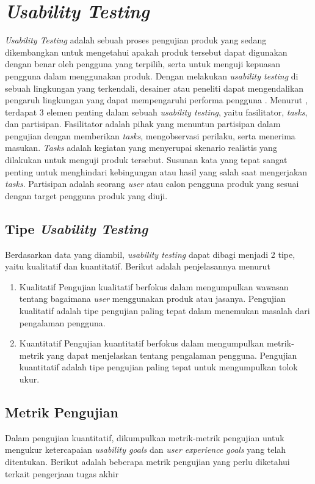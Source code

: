 \section{\textit{Usability Testing}}
\textit{Usability Testing} adalah sebuah proses pengujian produk yang sedang dikembangkan untuk mengetahui apakah produk tersebut dapat digunakan dengan benar oleh pengguna yang terpilih, serta untuk menguji kepuasan pengguna dalam menggunakan produk. Dengan melakukan \textit{usability testing} di sebuah lingkungan yang terkendali, desainer atau peneliti dapat mengendalikan pengaruh lingkungan yang dapat mempengaruhi performa pengguna \parencite{PreeceRogersSharp15}. Menurut \textcite{nielsengrouptesting}, terdapat 3 elemen penting dalam sebuah \textit{usability testing}, yaitu fasilitator, \textit{tasks}, dan partisipan. Fasilitator adalah pihak yang menuntun partisipan dalam pengujian dengan memberikan \textit{tasks}, mengobservasi perilaku, serta menerima masukan. \textit{Tasks} adalah kegiatan yang menyerupai skenario realistis yang dilakukan untuk menguji produk tersebut. Susunan kata yang tepat sangat penting untuk menghindari kebingungan atau hasil yang salah saat mengerjakan \textit{tasks}. Partisipan adalah seorang \textit{user} atau calon pengguna produk yang sesuai dengan target pengguna produk yang diuji. 

\subsection{Tipe \textit{Usability Testing}}
Berdasarkan data yang diambil, \textit{usability testing} dapat dibagi menjadi 2 tipe, yaitu kualitatif dan kuantitatif. Berikut adalah penjelasannya menurut \textcite{nielsengrouptesting}

\begin{enumerate}
  \item Kualitatif
  \subitem Pengujian kualitatif berfokus dalam mengumpulkan wawasan tentang bagaimana \textit{user} menggunakan produk atau jasanya. Pengujian kualitatif adalah tipe pengujian paling tepat dalam menemukan masalah dari pengalaman pengguna.

  \item Kuantitatif
  \subitem Pengujian kuantitatif berfokus dalam mengumpulkan metrik-metrik yang dapat menjelaskan tentang pengalaman pengguna. Pengujian kuantitatif adalah tipe pengujian paling tepat untuk mengumpulkan tolok ukur. 
\end{enumerate}


\subsection{Metrik Pengujian}
Dalam pengujian kuantitatif, dikumpulkan metrik-metrik pengujian untuk mengukur ketercapaian \textit{usability goals} dan \textit{user experience goals} yang telah ditentukan. Berikut adalah beberapa metrik pengujian yang perlu diketahui terkait pengerjaan tugas akhir


